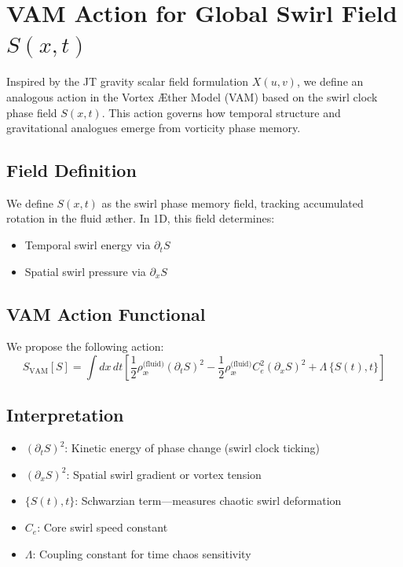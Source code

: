 \documentclass[preprint]{revtex4-2}
\begin{document}
            \section*{VAM Action for Global Swirl Field $S(x,t)$}
            Inspired by the JT gravity scalar field formulation $X(u,v)$, we define an analogous action in the Vortex \AE ther Model (VAM) based on the swirl clock phase field $S(x,t)$. This action governs how temporal structure and gravitational analogues emerge from vorticity phase memory.

            \subsection*{Field Definition}
            We define $S(x,t)$ as the swirl phase memory field, tracking accumulated rotation in the fluid æther. In 1D, this field determines:
            \begin{itemize}
            \item Temporal swirl energy via $\partial_t S$
            \item Spatial swirl pressure via $\partial_x S$
            \end{itemize}

            \subsection{VAM Action Functional}
            We propose the following action:
            \begin{equation}
            \boxed{
            S_{\text{VAM}}[S] = \int dx \, dt \left[
            \frac{1}{2} \rho_{\text{\ae}}^{\text{(fluid)}} (\partial_t S)^2
            - \frac{1}{2} \rho_{\text{\ae}}^{\text{(fluid)}} C_e^2 (\partial_x S)^2
            + \Lambda \, \{ S(t), t \}
            \right]
            }
            \end{equation}

            \subsection*{Interpretation}
            \begin{itemize}
            \item $(\partial_t S)^2$: Kinetic energy of phase change (swirl clock ticking)
            \item $(\partial_x S)^2$: Spatial swirl gradient or vortex tension
                \item $\{ S(t), t \}$: Schwarzian term—measures chaotic swirl deformation
            \item $C_e$: Core swirl speed constant
            \item $\Lambda$: Coupling constant for time chaos sensitivity
            \end{itemize}
\end{document}
